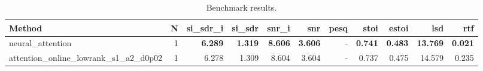 \begin{table}[t]
\centering
\caption{Benchmark results.}
\label{tab:bench}
\begin{tabular}{lrrrrrrrrrr}
\toprule
Method & N & si\_sdr\_i & si\_sdr & snr\_i & snr & pesq & stoi & estoi & lsd & rtf \\
\midrule
neural_attention & 1 & \textbf{6.289} & \textbf{1.319} & \textbf{8.606} & \textbf{3.606} & - & \textbf{0.741} & \textbf{0.483} & \textbf{13.769} & \textbf{0.021} \\
attention_online_lowrank_s1_a2_d0p02 & 1 & 6.278 & 1.309 & 8.604 & 3.604 & - & 0.737 & 0.475 & 14.579 & 0.235 \\
\bottomrule
\end{tabular}
\end{table}